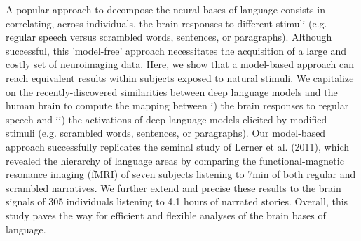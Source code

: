 A popular approach to decompose the neural bases of language consists in correlating, across individuals, the brain responses to different stimuli (e.g. regular speech versus scrambled words, sentences, or paragraphs). Although successful, this 'model-free' approach necessitates the acquisition of a large and costly set of neuroimaging data. Here, we show that a model-based approach can reach equivalent results within subjects exposed to natural stimuli. We capitalize on the recently-discovered similarities between deep language models and the human brain to compute the mapping between i) the brain responses to regular speech and ii) the activations of deep language models elicited by modified stimuli (e.g. scrambled words, sentences, or paragraphs). Our model-based approach successfully replicates the seminal study of Lerner et al. (2011), which revealed the hierarchy of language areas by comparing the functional-magnetic resonance imaging (fMRI) of seven subjects listening to 7min of both regular and scrambled narratives. We further extend and precise these results to the brain signals of 305 individuals listening to 4.1 hours of narrated stories. Overall, this study paves the way for efficient and flexible analyses of the brain bases of language.

